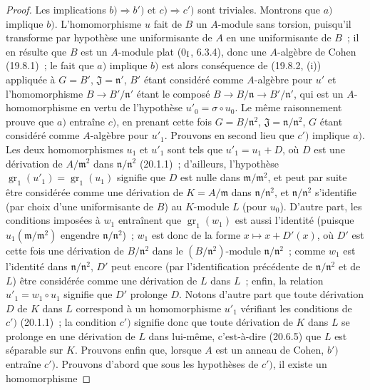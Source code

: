 \begin{proof}
Les implications $b)\Rightarrow b')$ et $c)\Rightarrow c')$ sont triviales.
Montrons que $a)$ implique $b)$.
L'homomorphisme $u$ fait de $B$ un $A$-module sans torsion, puisqu'il
transforme par hypothèse une uniformisante de $A$ en une uniformisante de $B$~;
il en résulte que $B$ est un $A$-module plat (0$_{\rm I}$, 6.3.4), donc une
$A$-algèbre de Cohen (19.8.1)~; le fait que $a)$ implique $b)$ est alors
 conséquence de (19.8.2, (i)) appliquée à $G=B'$, $\mathfrak J=\mathfrak n'$,
 $B'$ étant considéré comme $A$-algèbre pour $u'$ et l'homomorphisme
$B\to B'/\mathfrak n'$ étant le composé
$B\to B/\mathfrak n\to B'/\mathfrak n'$, qui est un $A$-homomorphisme en
 vertu de l'hypothèse $u'_0=\sigma\circ u_0$. Le même raisonnement prouve que
$a)$ entraîne $c)$, en prenant cette fois $G=B/\mathfrak n^2$,
$\mathfrak J=\mathfrak n/\mathfrak n^2$, $G$ étant considéré comme
$A$-algèbre pour $u'_1$.
Prouvons en second lieu que $c')$ implique $a)$. Les deux homomorphismes
$u_1$ et $u'_1$ sont tels que $u'_1=u_1+D$, où $D$ est une dérivation de
$A/\mathfrak m^2$ dans $\mathfrak n/\mathfrak n^2$ (20.1.1)~; d'ailleurs,
l'hypothèse $\operatorname{gr}_1(u'_1)=\operatorname{gr}_1(u_1)$ signifie
que $D$ est nulle dans $\mathfrak m/\mathfrak m^2$, et peut par suite être
considérée comme une dérivation de $K=A/\mathfrak m$ dans
$\mathfrak n/\mathfrak n^2$, et $\mathfrak n/\mathfrak n^2$ s'identifie
(par choix d'une uniformisante de $B$) au $K$-module $L$ (pour $u_0$).
D'autre part, les conditions imposées à $w_1$ entraînent que
 $\operatorname{gr}_1(w_1)$ est aussi l'identité (puisque
 $u_1(\mathfrak m/\mathfrak m^2)$ engendre
$\mathfrak n/\mathfrak n^2$)~; $w_1$ est donc de la forme
$x\mapsto x+D'(x)$, où $D'$ est cette fois une dérivation de
$B/\mathfrak n^2$ dans le $(B/\mathfrak n^2)$-module
$\mathfrak n/\mathfrak n^2$~; comme $w_1$ est l'identité dans
$\mathfrak n/\mathfrak n^2$, $D'$ peut encore (par l'identification
précédente de $\mathfrak n/\mathfrak n^2$ et de $L$) être considérée comme
une dérivation de $L$ dans $L$~; enfin, la relation $u'_1=w_1\circ u_1$
signifie que $D'$ prolonge $D$. Notons d'autre part que toute dérivation $D$
de $K$ dans $L$ correspond à un homomorphisme $u'_1$ vérifiant les conditions
de $c')$ (20.1.1)~; la condition $c')$ signifie donc que toute dérivation de
$K$ dans $L$ se prolonge en une dérivation de $L$ dans lui-même, c'est-à-dire
(20.6.5) que $L$ est séparable sur $K$.
Prouvons enfin que, lorsque $A$ est un anneau de Cohen, $b')$ entraîne $c')$.
Prouvons d'abord que sous les hypothèses de $c')$, il existe un homomorphisme

\end{proof}
